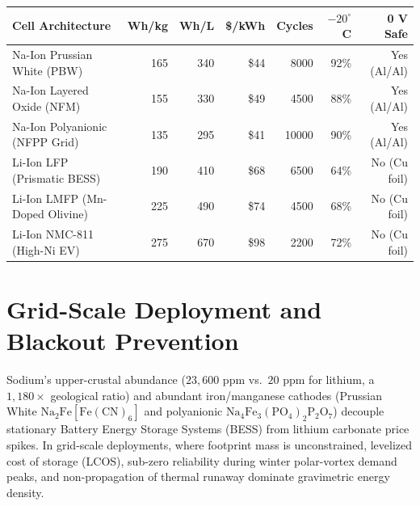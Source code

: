 \documentclass[11pt]{article}
\begin{document}
\begin{center}
\begin{tabular}{p{5.1cm}rrrrrr}
\hline
\textbf{Cell Architecture} & \textbf{Wh/kg} & \textbf{Wh/L} & \textbf{\$/kWh} & \textbf{Cycles} & \textbf{$-20^\circ$C} & \textbf{0 V Safe} \\
\hline
Na-Ion Prussian White (PBW) & 165 & 340 & \$44 & 8000 & 92\% & Yes (Al/Al) \\
Na-Ion Layered Oxide (NFM) & 155 & 330 & \$49 & 4500 & 88\% & Yes (Al/Al) \\
Na-Ion Polyanionic (NFPP Grid) & 135 & 295 & \$41 & 10000 & 90\% & Yes (Al/Al) \\
Li-Ion LFP (Prismatic BESS) & 190 & 410 & \$68 & 6500 & 64\% & No (Cu foil) \\
Li-Ion LMFP (Mn-Doped Olivine) & 225 & 490 & \$74 & 4500 & 68\% & No (Cu foil) \\
Li-Ion NMC-811 (High-Ni EV) & 275 & 670 & \$98 & 2200 & 72\% & No (Cu foil) \\
\hline
\end{tabular}
\end{center}

\section{Grid-Scale Deployment and Blackout Prevention}
\label{sec:grid-blackout}
Sodium's upper-crustal abundance ($23{,}600\text{ ppm}$ vs.\ $20\text{ ppm}$ for lithium, a $1{,}180\times$ geological ratio) and abundant iron/manganese cathodes (Prussian White $\text{Na}_2\text{Fe}[\text{Fe}(\text{CN})_6]$ and polyanionic $\text{Na}_4\text{Fe}_3(\text{PO}_4)_2\text{P}_2\text{O}_7$) decouple stationary Battery Energy Storage Systems (BESS) from lithium carbonate price spikes. In grid-scale deployments, where footprint mass is unconstrained, levelized cost of storage (LCOS), sub-zero reliability during winter polar-vortex demand peaks, and non-propagation of thermal runaway dominate gravimetric energy density.
\end{document}
